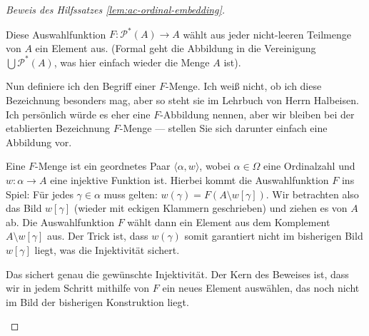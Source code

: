 \begin{proof}[Beweis des Hilfssatzes \ref{lem:ac-ordinal-embedding}]
\begin{spoken-clean}[01:05:16 - 01:06:31]
Diese Auswahlfunktion $F \colon \mathcal{P}^*(A) \to A$ wählt aus jeder nicht-leeren Teilmenge von $A$ ein Element aus. (Formal geht die Abbildung in die Vereinigung $\bigcup \mathcal{P}^*(A)$, was hier einfach wieder die Menge $A$ ist).

Nun definiere ich den Begriff einer $F$-Menge. Ich weiß nicht, ob ich diese Bezeichnung besonders mag, aber so steht sie im Lehrbuch von Herrn Halbeisen. Ich persönlich würde es eher eine $F$-Abbildung nennen, aber wir bleiben bei der etablierten Bezeichnung $F$-Menge --- stellen Sie sich darunter einfach eine Abbildung vor.

Eine $F$-Menge ist ein geordnetes Paar $\langle \alpha, w \rangle$, wobei $\alpha \in \Omega$ eine Ordinalzahl und $w \colon \alpha \to A$ eine injektive Funktion ist. Hierbei kommt die Auswahlfunktion $F$ ins Spiel: Für jedes $\gamma \in \alpha$ muss gelten: $w(\gamma) = F(A \setminus w[\gamma])$. Wir betrachten also das Bild $w[\gamma]$ (wieder mit eckigen Klammern geschrieben) und ziehen es von $A$ ab. Die Auswahlfunktion $F$ wählt dann ein Element aus dem Komplement $A \setminus w[\gamma]$ aus. Der Trick ist, dass $w(\gamma)$ somit garantiert nicht im bisherigen Bild $w[\gamma]$ liegt, was die Injektivität sichert.
\end{spoken-clean}

\begin{math-stroke}
\end{math-stroke}

\begin{spoken-clean}[01:06:31 - 01:08:09]
Das sichert genau die gewünschte Injektivität. Der Kern des Beweises ist, dass wir in jedem Schritt mithilfe von $F$ ein neues Element auswählen, das noch nicht im Bild der bisherigen Konstruktion liegt.


\end{spoken-clean}
\end{proof}
